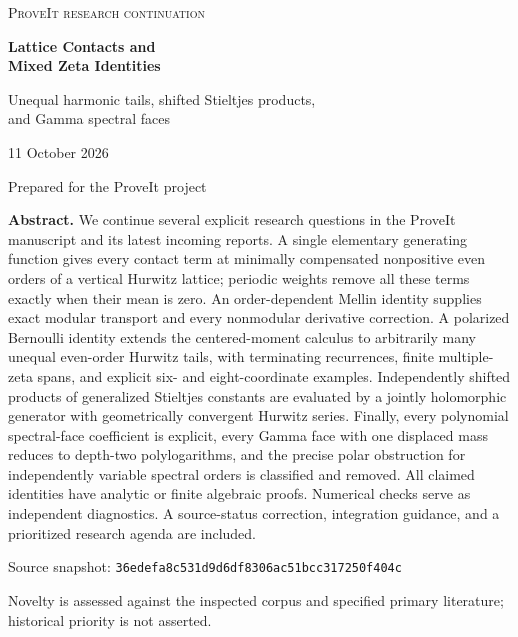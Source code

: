 \documentclass[11pt,letterpaper]{article}
\numberwithin{equation}{section}
\theoremstyle{definition}
\theoremstyle{remark}
\begin{document}
\hypersetup{pageanchor=false}
\begin{titlepage}
\centering
\vspace*{0.7in}
{\large\color{linkblue}\textsc{ProveIt research continuation}\par}
\vspace{0.35in}
{\Huge\bfseries\color{inkblue} Lattice Contacts and\\[5pt] Mixed Zeta Identities\par}
\vspace{0.22in}
{\Large Unequal harmonic tails, shifted Stieltjes products,\\[3pt]
and Gamma spectral faces\par}
\vspace{0.4in}
{\large 11 October 2026\par}
\vspace{0.2in}
{\normalsize Prepared for the ProveIt project\par}
\vspace{0.4in}
\begin{minipage}{0.9\textwidth}
\textbf{Abstract.}
We continue several explicit research questions in the ProveIt
manuscript and its latest incoming reports. A single elementary
generating function gives every contact term at minimally compensated
nonpositive even orders of a vertical Hurwitz lattice; periodic
weights remove all these terms exactly when their mean is zero.
An order-dependent Mellin identity supplies exact modular transport
and every nonmodular derivative correction. A polarized Bernoulli
identity extends the centered-moment calculus to arbitrarily many
unequal even-order Hurwitz tails, with terminating recurrences,
finite multiple-zeta spans, and explicit six- and eight-coordinate
examples. Independently shifted products of generalized Stieltjes
constants are evaluated by a jointly holomorphic generator with
geometrically convergent Hurwitz series. Finally, every polynomial
spectral-face coefficient is explicit, every Gamma face with one
displaced mass reduces to depth-two polylogarithms, and the precise
polar obstruction for independently variable spectral orders is
classified and removed. All claimed identities have analytic or
finite algebraic proofs. Numerical checks serve as independent
diagnostics. A source-status correction, integration guidance, and
a prioritized research agenda are included.
\end{minipage}
\vfill
{\small Source snapshot: \texttt{36edefa8c531d9d6df8306ac51bcc317250f404c}\par}
{\small Novelty is assessed against the inspected corpus and specified
primary literature; historical priority is not asserted.\par}
\end{titlepage}
\hypersetup{pageanchor=true}
\tableofcontents
\clearpage
{}
\end{document}
